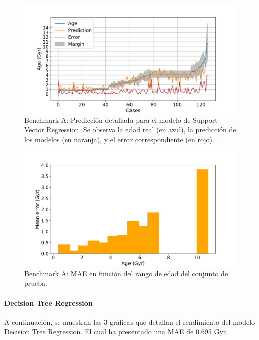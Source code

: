 \begin{figure}[H]
\begin{center}
 \includegraphics[width=0.8\linewidth]{Figuras/Experimentos/B_A_svm_2.pdf}
\end{center}
\caption{Benchmark A: Predicción detallada para el modelo de Support Vector Regression. Se observa la edad real (en azul), la predicción de los modelos (en naranja), y el error correspondiente (en rojo).}
 \label{fig:benchA_details_svm_2}
\end{figure}

\begin{figure}[H]
\begin{center}
 \includegraphics[width=0.8\linewidth]{Figuras/Experimentos/B_A_svm_3.pdf}
\end{center}
\caption{Benchmark A: MAE en función del rango de edad del conjunto de prueba.}
 \label{fig:benchA_details_svm_3}
\end{figure}

\paragraph{Decision Tree Regression} 
A continuación, se muestran las 3 gráficas que detallan el rendimiento del modelo Decision Tree Regression. El cual ha presentado una MAE de 0.695 Gyr.

